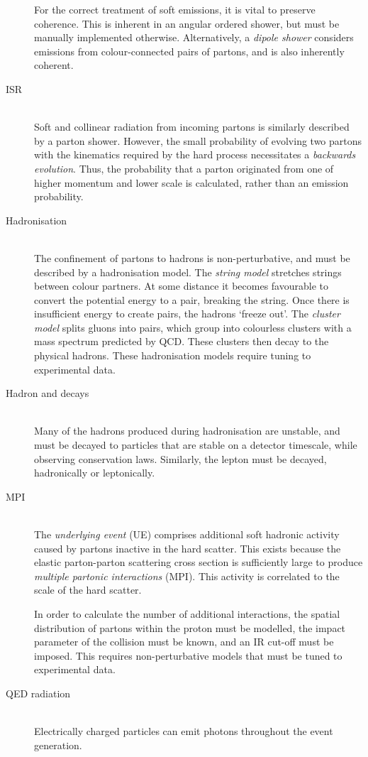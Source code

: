 \begin{description}
	For the correct treatment of soft emissions, it is vital to preserve coherence. This 
	is inherent in an angular ordered shower, but must be manually implemented otherwise. 
	Alternatively, a \textit{dipole shower} considers emissions from colour-connected 
	pairs of partons, and is also inherently coherent.
\item[\ac{ISR}] \hfill \\
	Soft and collinear radiation from incoming partons is similarly described by a parton 
	shower. However, the small probability of evolving two partons with the kinematics 
	required by the hard process necessitates a \textit{backwards evolution}. Thus, the 
	probability that a parton originated from one of higher momentum and lower scale is 
	calculated, rather than an emission probability.
\item[Hadronisation] \hfill \\
	The confinement of partons to hadrons is non-perturbative, and must be described by a 
	hadronisation model. The \textit{string model} stretches strings between colour 
	partners. At some distance it becomes favourable to convert the potential energy to a 
	\HepProcess{\Pquark \APquark} pair, breaking the string. Once there is insufficient 
	energy to create \HepProcess{\Pquark \APquark} pairs, the hadrons `freeze out'. The 
	\textit{cluster model} splits gluons into \HepProcess{\Pquark \APquark} pairs, which 
	group into colourless clusters with a mass spectrum predicted by \ac{QCD}. These 
	clusters then decay to the physical hadrons. These hadronisation models require 
	tuning to experimental data.
\item[Hadron and \Ptau decays] \hfill \\
	Many of the hadrons produced during hadronisation are unstable, and must be decayed to
	particles that are stable on a detector timescale, while observing conservation laws. 
	Similarly, the \Ptau lepton must be decayed, hadronically or leptonically.
\item[\ac{MPI}] \hfill \\
	The \textit{underlying event} (UE) comprises additional soft hadronic activity caused 
	by partons inactive in the hard scatter. This exists because the elastic 
	parton-parton scattering cross section is sufficiently large to produce 
	\textit{multiple partonic interactions} (MPI). This activity is correlated to the 
	scale of the hard scatter. 

	In order to calculate the number of additional interactions, the spatial distribution 
	of partons within the proton must be modelled, the impact parameter of the \pp 
	collision must be known, and an IR cut-off must be imposed. This requires 
	non-perturbative models that must be tuned to experimental data.
\item[\acs{QED} radiation] \hfill \\
	Electrically charged particles can emit photons throughout the event generation.
\end{description}



